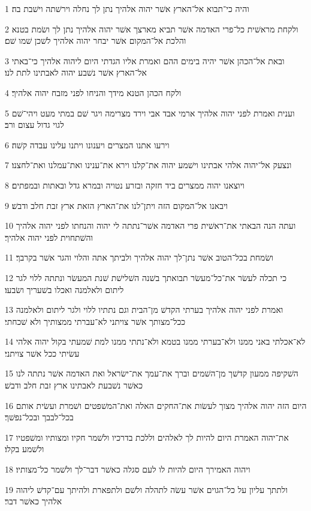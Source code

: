 \par 1 והיה כי־תבוא אל־הארץ אשׁר יהוה אלהיך נתן לך נחלה וירשׁתה וישׁבת בה׃
\par 2 ולקחת מראשׁית כל־פרי האדמה אשׁר תביא מארצך אשׁר יהוה אלהיך נתן לך ושׂמת בטנא והלכת אל־המקום אשׁר יבחר יהוה אלהיך לשׁכן שׁמו שׁם׃
\par 3 ובאת אל־הכהן אשׁר יהיה בימים ההם ואמרת אליו הגדתי היום ליהוה אלהיך כי־באתי אל־הארץ אשׁר נשׁבע יהוה לאבתינו לתת לנו׃
\par 4 ולקח הכהן הטנא מידך והניחו לפני מזבח יהוה אלהיך׃
\par 5 וענית ואמרת לפני יהוה אלהיך ארמי אבד אבי וירד מצרימה ויגר שׁם במתי מעט ויהי־שׁם לגוי גדול עצום ורב׃
\par 6 וירעו אתנו המצרים ויענונו ויתנו עלינו עבדה קשׁה׃
\par 7 ונצעק אל־יהוה אלהי אבתינו וישׁמע יהוה את־קלנו וירא את־ענינו ואת־עמלנו ואת־לחצנו׃
\par 8 ויוצאנו יהוה ממצרים ביד חזקה ובזרע נטויה ובמרא גדל ובאתות ובמפתים׃
\par 9 ויבאנו אל־המקום הזה ויתן־לנו את־הארץ הזאת ארץ זבת חלב ודבשׁ׃
\par 10 ועתה הנה הבאתי את־ראשׁית פרי האדמה אשׁר־נתתה לי יהוה והנחתו לפני יהוה אלהיך והשׁתחוית לפני יהוה אלהיך׃
\par 11 ושׂמחת בכל־הטוב אשׁר נתן־לך יהוה אלהיך ולביתך אתה והלוי והגר אשׁר בקרבך׃
\par 12 כי תכלה לעשׂר את־כל־מעשׂר תבואתך בשׁנה השׁלישׁת שׁנת המעשׂר ונתתה ללוי לגר ליתום ולאלמנה ואכלו בשׁעריך ושׂבעו׃
\par 13 ואמרת לפני יהוה אלהיך בערתי הקדשׁ מן־הבית וגם נתתיו ללוי ולגר ליתום ולאלמנה ככל־מצותך אשׁר צויתני לא־עברתי ממצותיך ולא שׁכחתי׃
\par 14 לא־אכלתי באני ממנו ולא־בערתי ממנו בטמא ולא־נתתי ממנו למת שׁמעתי בקול יהוה אלהי עשׂיתי ככל אשׁר צויתני׃
\par 15 השׁקיפה ממעון קדשׁך מן־השׁמים וברך את־עמך את־ישׂראל ואת האדמה אשׁר נתתה לנו כאשׁר נשׁבעת לאבתינו ארץ זבת חלב ודבשׁ׃
\par 16 היום הזה יהוה אלהיך מצוך לעשׂות את־החקים האלה ואת־המשׁפטים ושׁמרת ועשׂית אותם בכל־לבבך ובכל־נפשׁך׃
\par 17 את־יהוה האמרת היום להיות לך לאלהים וללכת בדרכיו ולשׁמר חקיו ומצותיו ומשׁפטיו ולשׁמע בקלו׃
\par 18 ויהוה האמירך היום להיות לו לעם סגלה כאשׁר דבר־לך ולשׁמר כל־מצותיו׃
\par 19 ולתתך עליון על כל־הגוים אשׁר עשׂה לתהלה ולשׁם ולתפארת ולהיתך עם־קדשׁ ליהוה אלהיך כאשׁר דבר׃

